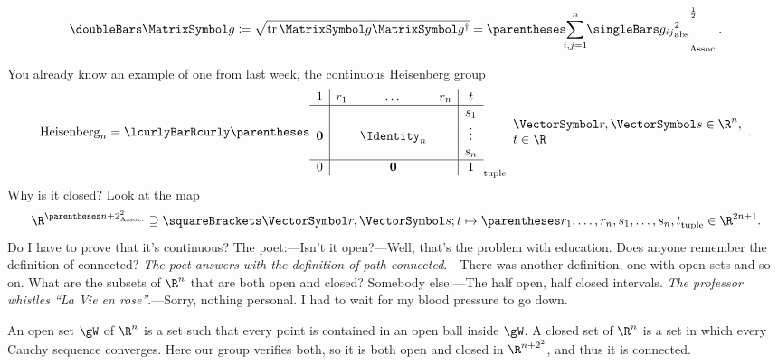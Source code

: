 \documentclass[10pt, a4paper, twoside]{lecturenotes}
\newcommand{\Rn}{{\R^n}}
\begin{document}
\begin{lecture}[date=2013-04-23]
\begin{definition}
\[\FrobeniusNorm\matg \DefineAs \sqrt{\Trace\matg\adj\matg} = \pa{\sum{i,j=1}[n]\abs{g_{ij}}^2}^{\frac{1}{2}}\text.
\]
\end{definition}
You already know an example of one from last week, the continuous Heisenberg group\[
\HeisenbergGroup[n]=\setst{\tuple{
\begin{array}{c|ccc|c}
1&r_1&\dotsc&r_n&t\\
\hline
&&&&s_1\\
\nullvec&&\Identity_n&&\vdots\\
&&&&s_n\\
\hline
0&&\nullvec&&1
\end{array}
}}{\begin{array}{l}\vr,\vs\in\Rn,\\ t\in\R\end{array}}\text.
\]
Why is it closed? Look at the map\[
\FunctionBody{\R^{\pa{n+2}^2}\Superset\Helt \vr \vs t} {\tuple{r_1,\dotsc,r_n,s_1,\dotsc,s_n,t}\in\R^{2n+1}}\text.
\]
Do I have to prove that it's continuous? 
The poet:---Isn't it open?---Well, that's the problem with education. Does anyone remember the definition of connected? \emph{The poet answers with the definition of path-connected}.---There was another definition, one with open sets and so on. What are the subsets of $\Rn$ that are both open and closed? Somebody else:---The half open, half closed intervals. \emph{The professor whistles ``La Vie en rose''}.---Sorry, nothing personal. I had to wait for my blood pressure to go down.

An open set $\gW$ of $\Rn$ is a set such that every point is contained in an open ball inside $\gW$. A closed set of  $\Rn$ is a set in which every Cauchy sequence converges. Here our group verifies both, so it is both open and closed in $\R^{{n+2}^2}$, and thus it is connected.


\end{lecture}
\end{document}

